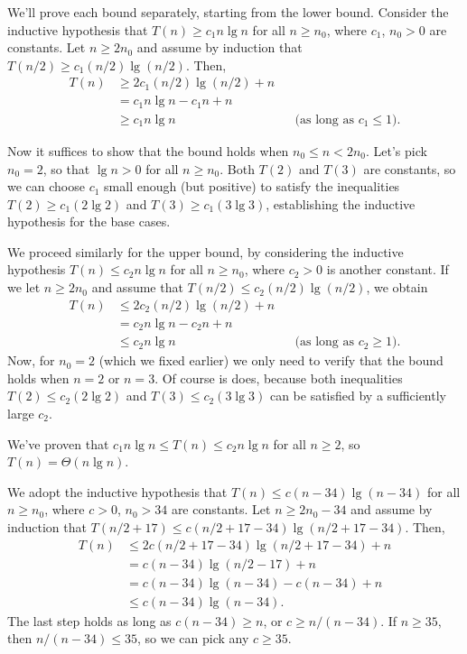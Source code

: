 \subexercise
We'll prove each bound separately, starting from the lower bound.
Consider the inductive hypothesis that $T(n)\ge c_1n\lg n$ for all $n\ge n_0$, where $c_1$, $n_0>0$ are constants.
Let $n\ge2n_0$ and assume by induction that $T(n/2)\ge c_1(n/2)\lg(n/2)$.
Then,
\begin{align*}
    T(n) &\ge 2c_1(n/2)\lg(n/2)+n \\
    &= c_1n\lg n-c_1n+n \\
    &\ge c_1n\lg n && \text{(as long as $c_1\le1$)}.
\end{align*}

Now it suffices to show that the bound holds when $n_0\le n<2n_0$.
Let's pick $n_0=2$, so that $\lg n>0$ for all $n\ge n_0$.
Both $T(2)$ and $T(3)$ are constants, so we can choose $c_1$ small enough (but positive) to satisfy the inequalities $T(2)\ge c_1(2\lg2)$ and $T(3)\ge c_1(3\lg3)$, establishing the inductive hypothesis for the base cases.

We proceed similarly for the upper bound, by considering the inductive hypothesis $T(n)\le c_2n\lg n$ for all $n\ge n_0$, where $c_2>0$ is another constant.
If we let $n\ge2n_0$ and assume that $T(n/2)\le c_2(n/2)\lg(n/2)$, we obtain
\begin{align*}
    T(n) &\le 2c_2(n/2)\lg(n/2)+n \\
    &= c_2n\lg n-c_2n+n \\
    &\le c_2n\lg n && \text{(as long as $c_2\ge1$)}.
\end{align*}
Now, for $n_0=2$ (which we fixed earlier) we only need to verify that the bound holds when $n=2$ or $n=3$.
Of course is does, because both inequalities $T(2)\le c_2(2\lg2)$ and $T(3)\le c_2(3\lg3)$ can be satisfied by a sufficiently large $c_2$.

We've proven that $c_1n\lg n\le T(n)\le c_2n\lg n$ for all $n\ge2$, so $T(n)=\Theta(n\lg n)$.

\subexercise
We adopt the inductive hypothesis that $T(n)\le c(n-34)\lg(n-34)$ for all $n\ge n_0$, where $c>0$, $n_0>34$ are constants.
Let $n\ge2n_0-34$ and assume by induction that $T(n/2+17)\le c(n/2+17-34)\lg(n/2+17-34)$.
Then,
\begin{align*}
    T(n) &\le 2c(n/2+17-34)\lg(n/2+17-34)+n \\
    &= c(n-34)\lg(n/2-17)+n \\
    &= c(n-34)\lg(n-34)-c(n-34)+n \\
    &\le c(n-34)\lg(n-34).
\end{align*}
The last step holds as long as $c(n-34)\ge n$, or $c\ge n/(n-34)$.
If $n\ge35$, then $n/(n-34)\le35$, so we can pick any $c\ge35$.

